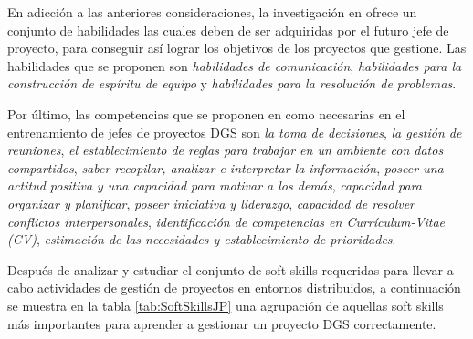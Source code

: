 En adicción a las anteriores consideraciones, la investigación en \cite{sutling2015understanding} ofrece un conjunto de habilidades las cuales deben de ser adquiridas por el futuro jefe de proyecto, para conseguir así lograr los objetivos de los proyectos que gestione. Las habilidades que se proponen son \emph{habilidades de comunicación}, \emph{habilidades para la construcción de espíritu de equipo} y \emph{habilidades para la resolución de problemas}.

Por último, las competencias que se proponen en \cite{saldana2014skills} como necesarias en el entrenamiento de jefes de proyectos DGS son \emph{la toma de decisiones}, \emph{la gestión de reuniones}, \emph{el establecimiento de reglas para trabajar en un ambiente con datos compartidos}, \emph{saber recopilar, analizar e interpretar la información}, \emph{poseer una actitud positiva y una capacidad para motivar a los demás}, \emph{capacidad para organizar y planificar}, \emph{poseer iniciativa y liderazgo}, \emph{capacidad de resolver conflictos interpersonales}, \emph{identificación de competencias en Currículum-Vitae (CV)}, \emph{estimación de las necesidades y establecimiento de prioridades}.

Después de analizar y estudiar el conjunto de soft skills requeridas para llevar a cabo actividades de gestión de proyectos en entornos distribuidos, a continuación se muestra en la tabla \ref{tab:SoftSkillsJP} una agrupación de aquellas soft skills más importantes para aprender a gestionar un proyecto DGS correctamente.

